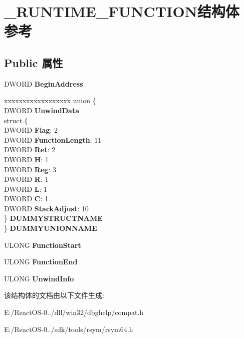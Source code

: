 \hypertarget{struct___r_u_n_t_i_m_e___f_u_n_c_t_i_o_n}{}\section{\+\_\+\+R\+U\+N\+T\+I\+M\+E\+\_\+\+F\+U\+N\+C\+T\+I\+O\+N结构体 参考}
\label{struct___r_u_n_t_i_m_e___f_u_n_c_t_i_o_n}
\subsection*{Public 属性}
\begin{DoxyCompactItemize}
\item 
\mbox{\label{struct___r_u_n_t_i_m_e___f_u_n_c_t_i_o_n_a8b3ea6273db2ad3673f3db4c9ab18717}} 
D\+W\+O\+RD {\bfseries Begin\+Address}
\item 
\mbox{\label{struct___r_u_n_t_i_m_e___f_u_n_c_t_i_o_n_ac8781e62a124ff76c2df2a29eb091abb}} 
\begin{tabbing}
xx\=xx\=xx\=xx\=xx\=xx\=xx\=xx\=xx\=\kill
union \{\\
\>DWORD {\bfseries UnwindData}\\
\>struct \{\\
\>\>DWORD {\bfseries Flag}: 2\\
\>\>DWORD {\bfseries FunctionLength}: 11\\
\>\>DWORD {\bfseries Ret}: 2\\
\>\>DWORD {\bfseries H}: 1\\
\>\>DWORD {\bfseries Reg}: 3\\
\>\>DWORD {\bfseries R}: 1\\
\>\>DWORD {\bfseries L}: 1\\
\>\>DWORD {\bfseries C}: 1\\
\>\>DWORD {\bfseries StackAdjust}: 10\\
\>\} {\bfseries DUMMYSTRUCTNAME}\\
\} {\bfseries DUMMYUNIONNAME}\\

\end{tabbing}\item 
\mbox{\label{struct___r_u_n_t_i_m_e___f_u_n_c_t_i_o_n_ad00a7ee22db0b4a2dde385b948de4ed0}} 
U\+L\+O\+NG {\bfseries Function\+Start}
\item 
\mbox{\label{struct___r_u_n_t_i_m_e___f_u_n_c_t_i_o_n_ab5843912508a3732b75daef7a2e7d4fa}} 
U\+L\+O\+NG {\bfseries Function\+End}
\item 
\mbox{\label{struct___r_u_n_t_i_m_e___f_u_n_c_t_i_o_n_a309a2a4e396c8b4effd0fe96d4d5b417}} 
U\+L\+O\+NG {\bfseries Unwind\+Info}
\end{DoxyCompactItemize}


该结构体的文档由以下文件生成\+:\begin{DoxyCompactItemize}
\item 
E\+:/\+React\+O\+S-\/0../dll/win32/dbghelp/compat.\+h\item 
E\+:/\+React\+O\+S-\/0../sdk/tools/rsym/rsym64.\+h\end{DoxyCompactItemize}
